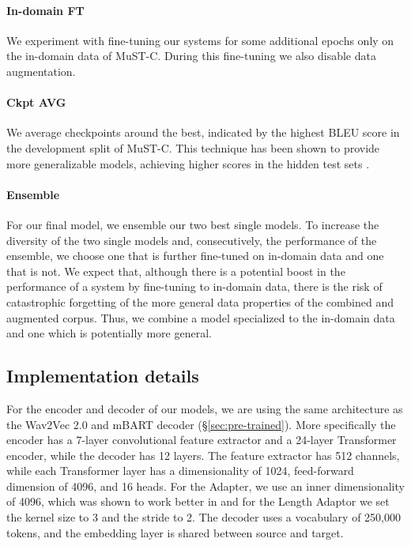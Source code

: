 \documentclass[11pt,a4paper]{article}
\begin{document}
        \paragraph{In-domain FT} We experiment with fine-tuning our systems for some additional epochs only on the in-domain data of MuST-C. During this fine-tuning we also disable data augmentation.
        
        \paragraph{Ckpt AVG} We average checkpoints around the best, indicated by the highest BLEU score in the development split of MuST-C. This technique has been shown to provide more generalizable models, achieving higher scores in the hidden test sets \cite{fbk2020,bhanss2020}.
        
        \paragraph{Ensemble} For our final model, we ensemble our two best single models. To increase the diversity of the two single models and, consecutively, the performance of the ensemble, we choose one that is further fine-tuned on in-domain data and one that is not.
        We expect that, although there is a potential boost in the performance of a system by fine-tuning to in-domain data, there is the risk of catastrophic forgetting of the more general data properties of the combined and augmented corpus. Thus, we combine a model specialized to the in-domain data and one which is potentially more general.

    \subsection{Implementation details}

        For the encoder and decoder of our models, we are using the same architecture as the Wav2Vec 2.0 and mBART decoder (\S \ref{sec:pre-trained}). More specifically the encoder has a 7-layer convolutional feature extractor and a 24-layer Transformer encoder, while the decoder has 12 layers. The feature extractor has 512 channels, while each Transformer layer has a dimensionality of 1024, feed-forward dimension of 4096, and 16 heads. For the Adapter, we use an inner dimensionality of 4096, which was shown to work better in \citet{adapter-st} and for the Length Adaptor we set the kernel size to 3 and the stride to 2. The decoder uses a vocabulary of 250,000 tokens, and the embedding layer is shared between source and target.
        
\end{document}
